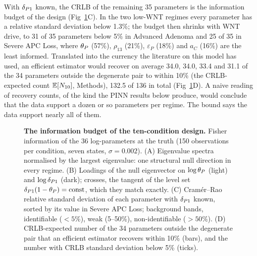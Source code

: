 With $\delta_{P1}$ known, the CRLB of the remaining 35 parameters is the information
budget of the design (Fig~\ref{fig:info}C). In the two low-WNT regimes every
parameter has a relative standard deviation below 1.3\%; the budget then
shrinks with WNT drive, to 31 of 35 parameters below 5\% in Advanced Adenoma
and 25 of 35 in Severe APC Loss, where $\theta_P$ (57\%), $\rho_{13}$ (21\%),
$\varepsilon_P$ (18\%) and $a_C$ (16\%) are the least informed. Translated into
the currency the literature on this model has used, an efficient estimator would
recover on average 34.0, 34.0, 33.4 and 31.1 of the 34 parameters outside the
degenerate pair to within 10\% (the CRLB-expected count $\mathbb{E}[N_{10}]$,
Methods), 132.5 of 136 in total (Fig~\ref{fig:info}D). A naive reading of recovery counts, of the kind the PINN results below produce,
would conclude that the data support a dozen or so parameters per regime. The
bound says the data support nearly all of them.

\begin{figure}[tbp]
\centering
{}
\caption{\textbf{The information budget of the ten-condition design.} Fisher
information of the 36 log-parameters at the truth (150 observations per
condition, seven states, $\sigma=0.002$). (A) Eigenvalue spectra normalised by
the largest eigenvalue: one structural null direction in every regime. (B)
Loadings of the null eigenvector on $\log\theta_P$ (light) and $\log\delta_{P1}$ (dark);
crosses, the tangent of the level set $\delta_{P1}(1-\theta_P)=\text{const}$, which they
match exactly. (C) Cram\'er--Rao relative standard deviation of each parameter
with $\delta_{P1}$ known, sorted by its value in Severe APC Loss; background bands,
identifiable ($<5\%$), weak (5--50\%), non-identifiable ($>50\%$). (D)
CRLB-expected number of the 34 parameters outside the degenerate pair that an
efficient estimator recovers within 10\% (bars), and the number with CRLB
standard deviation below 5\% (ticks).}
\label{fig:info}
\end{figure}
